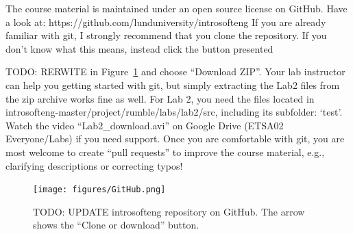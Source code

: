 \documentclass{scrreprt}
\begin{document}
The course material is maintained under an open source license on GitHub. Have a look at: https://github.com/lunduniversity/introsofteng
If you are already familiar with git, I strongly recommend that you clone the repository. If you don't know what this means, instead click the button presented 

TODO: RERWITE
in Figure~\ref{fig:github} and choose ``Download ZIP''. Your lab instructor can help you getting started with git, but simply extracting the Lab2 files from the zip archive works fine as well. For Lab 2, you need the files located in introsofteng-master/project/rumble/labs/lab2/src, including its subfolder: `test'. Watch the video ``Lab2_download.avi'' on Google Drive (ETSA02 Everyone/Labs) if you need support. Once you are comfortable with git, you are most welcome to create ``pull requests'' to improve the course material, e.g., clarifying descriptions or correcting typos!

\begin{figure}
\centering
\texttt{[image: figures/GitHub.png]}
\caption{TODO: UPDATE introsofteng repository on GitHub. The arrow shows the ``Clone or download'' button.}
\label{fig:github}
\end{figure}
\end{document}
